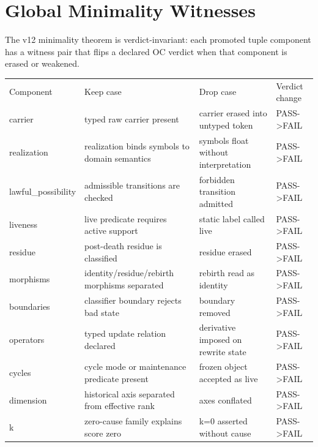\section{Global Minimality Witnesses}
The v12 minimality theorem is verdict-invariant: each promoted tuple component has a witness pair that flips a declared OC verdict when that component is erased or weakened.
\begin{tabular}{llll}
Component & Keep case & Drop case & Verdict change \\
carrier & typed raw carrier present & carrier erased into untyped token & PASS->FAIL \\
realization & realization binds symbols to domain semantics & symbols float without interpretation & PASS->FAIL \\
lawful_possibility & admissible transitions are checked & forbidden transition admitted & PASS->FAIL \\
liveness & live predicate requires active support & static label called live & PASS->FAIL \\
residue & post-death residue is classified & residue erased & PASS->FAIL \\
morphisms & identity/residue/rebirth morphisms separated & rebirth read as identity & PASS->FAIL \\
boundaries & classifier boundary rejects bad state & boundary removed & PASS->FAIL \\
operators & typed update relation declared & derivative imposed on rewrite state & PASS->FAIL \\
cycles & cycle mode or maintenance predicate present & frozen object accepted as live & PASS->FAIL \\
dimension & historical axis separated from effective rank & axes conflated & PASS->FAIL \\
k & zero-cause family explains score zero & k=0 asserted without cause & PASS->FAIL \\
\end{tabular}
